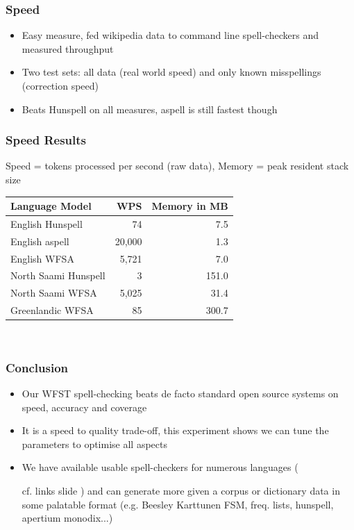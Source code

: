 \documentclass[t,12pt]{beamer}
\begin{document}
\begin{frame}
    \frametitle{Speed}
    \begin{itemize}
        \item Easy measure, fed wikipedia data to command line spell-checkers
            and measured throughput
        \item Two test sets: all data (real world speed) and only known
            misspellings (correction speed)
        \item Beats Hunspell on all measures, aspell is still fastest though
    \end{itemize}
\end{frame}

\begin{frame}
    \frametitle{Speed Results}
    Speed = tokens processed per second (raw data), Memory = peak resident stack
    size\\
    \begin{tabular}{l|rr}
        Language Model & WPS & Memory in MB\\
        \hline
       English Hunspell & 74 & 7.5 \\
       English aspell & 20,000 & 1.3 \\
       English WFSA & 5,721 & 7.0 \\
        \hline
        North Saami Hunspell & 3 & 151.0 \\
       North Saami WFSA & 5,025 & 31.4 \\
        \hline
        Greenlandic WFSA & 85 & 300.7 \\
    \end{tabular}\\
\end{frame}

\begin{frame}
    \frametitle{Conclusion}
    \begin{itemize}
        \item Our WFST spell-checking beats de facto standard open source
            systems on speed, accuracy and coverage
        \item It is a speed to quality trade-off, this experiment shows we can
            tune the parameters to optimise all aspects
        \item We have available usable spell-checkers for numerous languages
        (

        \iftrue
        cf. links slide
        \fi)
            and can generate more given a corpus or dictionary data in some
            palatable format (e.g. Beesley Karttunen FSM, freq. lists,
            hunspell, apertium monodix...)
    \end{itemize}
\end{frame}
\end{document}

